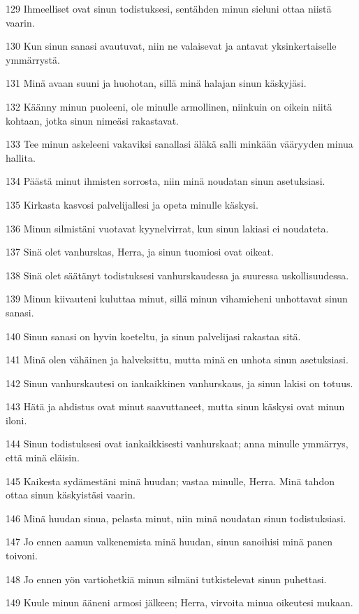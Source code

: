 \par 129 Ihmeelliset ovat sinun todistuksesi, sentähden minun sieluni ottaa niistä vaarin.
\par 130 Kun sinun sanasi avautuvat, niin ne valaisevat ja antavat yksinkertaiselle ymmärrystä.
\par 131 Minä avaan suuni ja huohotan, sillä minä halajan sinun käskyjäsi.
\par 132 Käänny minun puoleeni, ole minulle armollinen, niinkuin on oikein niitä kohtaan, jotka sinun nimeäsi rakastavat.
\par 133 Tee minun askeleeni vakaviksi sanallasi äläkä salli minkään vääryyden minua hallita.
\par 134 Päästä minut ihmisten sorrosta, niin minä noudatan sinun asetuksiasi.
\par 135 Kirkasta kasvosi palvelijallesi ja opeta minulle käskysi.
\par 136 Minun silmistäni vuotavat kyynelvirrat, kun sinun lakiasi ei noudateta.
\par 137 Sinä olet vanhurskas, Herra, ja sinun tuomiosi ovat oikeat.
\par 138 Sinä olet säätänyt todistuksesi vanhurskaudessa ja suuressa uskollisuudessa.
\par 139 Minun kiivauteni kuluttaa minut, sillä minun vihamieheni unhottavat sinun sanasi.
\par 140 Sinun sanasi on hyvin koeteltu, ja sinun palvelijasi rakastaa sitä.
\par 141 Minä olen vähäinen ja halveksittu, mutta minä en unhota sinun asetuksiasi.
\par 142 Sinun vanhurskautesi on iankaikkinen vanhurskaus, ja sinun lakisi on totuus.
\par 143 Hätä ja ahdistus ovat minut saavuttaneet, mutta sinun käskysi ovat minun iloni.
\par 144 Sinun todistuksesi ovat iankaikkisesti vanhurskaat; anna minulle ymmärrys, että minä eläisin.
\par 145 Kaikesta sydämestäni minä huudan; vastaa minulle, Herra. Minä tahdon ottaa sinun käskyistäsi vaarin.
\par 146 Minä huudan sinua, pelasta minut, niin minä noudatan sinun todistuksiasi.
\par 147 Jo ennen aamun valkenemista minä huudan, sinun sanoihisi minä panen toivoni.
\par 148 Jo ennen yön vartiohetkiä minun silmäni tutkistelevat sinun puhettasi.
\par 149 Kuule minun ääneni armosi jälkeen; Herra, virvoita minua oikeutesi mukaan.
